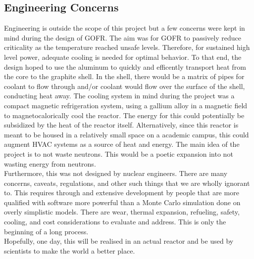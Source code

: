\subsection{Engineering Concerns}
Engineering is outside the scope of this project but a few concerns were kept in mind during the design of GOFR. The aim was for GOFR to passively reduce criticality as the temperature reached unsafe levels. Therefore, for sustained high level power, adequate cooling is needed for optimal behavior. To that end, the design hoped to use the aluminum to quickly and efficently transport heat from the core to the graphite shell. In the shell, there would be a matrix of pipes for coolant to flow through and/or coolant would flow over the surface of the shell, conducting heat away. The cooling system in mind during the project was a compact magnetic refrigeration system, using a gallium alloy in a magnetic field to magnetocalorically cool the reactor. The energy for this could potentially be subsidized by the heat of the reactor itself. Alternatively, since this reactor is meant to be housed in a relatively small space on a academic campus, this could augment HVAC systems as a source of heat and energy. The main idea of the project is to not waste neutrons. This would be a poetic expansion into not wasting energy from neutrons.\\

Furthermore, this was not designed by nuclear engineers. There are many concerns, caveats, regulations, and other such things that we are wholly ignorant to. This requires through and extensive development by people that are more qualified with software more powerful than a Monte Carlo simulation done on overly simplistic models. There are wear, thermal expansion, refueling, safety, cooling, and cost considerations to evaluate and address. This is only the beginning of a long process.\\

Hopefully, one day, this will be realised in an actual reactor and be used by scientists to make the world a better place.